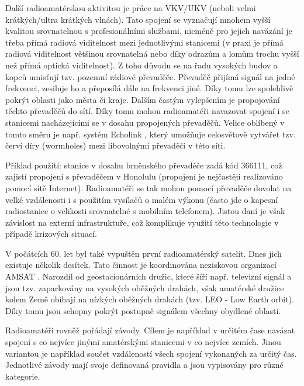 Další radioamatérskou aktivitou je práce na VKV/UKV (neboli velmi krátkých/ultra
krátkých vlnách). Tato spojení se vyznačují mnohem vyšší kvalitou srovnatelnou s
profesionálními službami, nicméně pro jejich navázání je třeba přímá radiová
viditelnost mezi jednotlivými stanicemi (v praxi je přímá radiová viditelnost
většinou srovnatelná nebo díky odrazům a lomům trochu vyšší než přímá optická
viditelnost).
Z toho důvodu se na řadu vysokých budov a kopců umisťují tzv. pozemní rádiové
převaděče. Převaděč přijímá signál na jedné frekvenci, zesiluje ho a přeposílá
dále na frekvenci jiné. Díky tomu lze spolehlivě pokrýt oblasti jako města či kraje.
Dalším častým vylepšením je propojování těchto převaděčů do sítí. Díky tomu mohou
radioamatéři navazovat spojení i se stanicemi nacházejícími se v dosahu
propojených převaděčů. Velice oblíbený v tomto směru je např. systém
Echolink \cite{echolink}, %
který umožňuje celosvětově vytvářet tzv. červí díry (wormholes) mezi libovolnými
převaděči v této síti.

Příklad použití: stanice v dosahu brněnského převaděče
zadá kód 366111, což zajistí propojení s převaděčem v Honolulu (propojení je
nejčastěji realizováno pomocí sítě Internet). Radioamatéři se tak mohou pomocí převaděče dovolat na velké vzdálenosti i s použitím vysílačů o malém výkonu
(často jde o kapesní radiostanice o velikosti srovnatelné s mobilním telefonem).
Jistou daní je však závislost na externí infrastruktuře, což komplikuje využití
této technologie v případě krizových situací.

V počátcích 60. let byl také vypuštěn první radioamatérský satelit. Dnes jich existuje několik desítek.
Tato činnost je koordinována neziskovou organizací AMSAT \cite{amsat}. %
Narozdíl od geostacionárních družic, které šíří např. televizní
signál a jsou tzv. zaparkovány na vysokých oběžných drahách, však amatérské
družice kolem Země obíhají na nízkých oběžných drahách (tzv. LEO - Low Earth
orbit). %
Díky tomu jsou schopny pokrýt postupně signálem všechny obydlené oblasti.

Radioamatéři rovněž pořádají závody. Cílem je například v určitém čase navázat spojení s co nejvíce jinými
amatérskými stanicemi v co nejvíce zemích. Jinou variantou je například součet vzdáleností všech spojení vykonaných za určitý
čas. Jednotlivé závody mají svoje definovaná pravidla a jsou vypisovány pro
různé kategorie.

